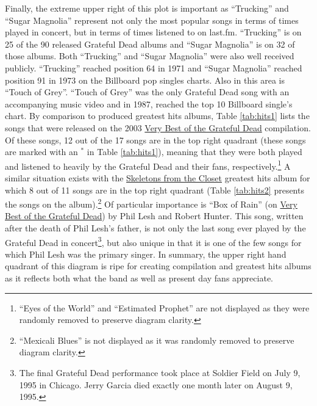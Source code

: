 \documentclass{svmult}
\newcommand{\ttt}[1]{``#1''}
\newcommand{\album}[1]{\uline{#1}}
\begin{document}
Finally, the extreme upper right of this plot is important as \ttt{Trucking} and \ttt{Sugar Magnolia} represent not only the most popular songs in terms of times played in concert, but in terms of times listened to on last.fm. \ttt{Trucking} is on 25 of the 90 released Grateful Dead albums and \ttt{Sugar Magnolia} is on 32 of those albums. Both \ttt{Trucking} and \ttt{Sugar Magnolia} were also well received publicly. \ttt{Trucking} reached position 64 in 1971 and \ttt{Sugar Magnolia} reached position 91 in 1973 on the Billboard pop singles charts. Also in this area is \ttt{Touch of Grey}. \ttt{Touch of Grey} was the only Grateful Dead song with an accompanying music video and in 1987, reached the top 10 Billboard single's chart. By comparison to produced greatest hits albums, Table \ref{tab:hits1} lists the songs that were released on the 2003 \album{Very Best of the Grateful Dead} compilation. Of these songs, 12 out of the 17 songs are in the top right quadrant (these songs are marked with an $^*$ in Table \ref{tab:hits1}), meaning that they were both played and listened to heavily by the Grateful Dead and their fans, respectively.\footnote{\ttt{Eyes of the World} and \ttt{Estimated Prophet} are not displayed as they were randomly removed to preserve diagram clarity.} A similar situation exists with the \album{Skeletons from the Closet} greatest hits album for which 8 out of 11 songs are in the top right quadrant \cite{skelcloset:dead1974} (Table \ref{tab:hits2} presents the songs on the album).\footnote{\ttt{Mexicali Blues} is not displayed as it was randomly removed to preserve diagram clarity.} Of particular importance is \ttt{Box of Rain} (on \album{Very Best of the Grateful Dead}) by Phil Lesh and Robert Hunter. This song, written after the death of Phil Lesh's father, is not only the last song ever played by the Grateful Dead in concert\footnote{The final Grateful Dead performance took place at Soldier Field on July 9, 1995 in Chicago. Jerry Garcia died exactly one month later on August 9, 1995.}, but also unique in that it is one of the few songs for which Phil Lesh was the primary singer. In summary, the upper right hand quadrant of this diagram is ripe for creating compilation and greatest hits albums as it reflects both what the band as well as present day fans appreciate.
\end{document}
